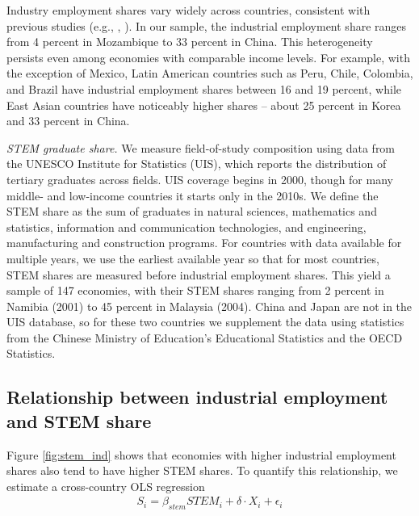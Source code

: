 \documentclass[12pt]{article} %
\theoremstyle{definition}
\begin{document}
Industry  employment shares vary widely across countries, consistent with previous studies (e.g., \cite{Rodrik2016}, \cite{huneeus2024heterogeneous}). In our sample, the industrial employment share ranges from 4 percent in Mozambique to 33 percent in China. This heterogeneity persists even among economies with comparable income levels. For example, with the exception of Mexico, Latin American countries such as Peru, Chile, Colombia, and Brazil have industrial  employment shares between 16 and 19 percent, while East Asian countries have noticeably higher shares --  about 25 percent in Korea and  33 percent in China.  


\noindent \textit{STEM graduate share.}
We measure field-of-study composition using data from the UNESCO Institute for Statistics (UIS), which reports the distribution of tertiary graduates across fields. UIS coverage begins in 2000, though for many middle- and low-income countries it starts only in the 2010s. We define the STEM share as the sum of graduates in natural sciences, mathematics and statistics,  information and communication technologies, and engineering, manufacturing and construction programs. 
For countries with data available for multiple years, we use the earliest available year so that for most countries, STEM shares are measured before industrial employment shares.  This yield a sample of 147 economies, with their STEM shares ranging from 2 percent in Namibia (2001) to 45 percent in Malaysia (2004). China and Japan are not in the UIS database, so for these two countries we supplement the data using statistics from the Chinese Ministry of Education's Educational Statistics and the OECD Statistics. 



\subsection{Relationship between industrial employment and STEM share}

Figure \ref{fig:stem_ind}  shows that economies with higher industrial employment shares also tend to have   higher STEM shares. To quantify this relationship, we  estimate a cross-country OLS regression 
\begin{align}\label{regression}
    S_i = \beta_{stem} STEM_i + \delta \cdot X_i + \epsilon_i
\end{align}
\end{document}
